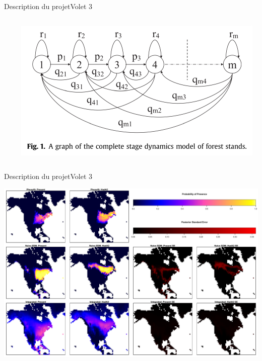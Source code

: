\documentclass{eecslides}
\begin{document}
\begin{frame}{Description du projet}{Volet 3}
\begin{columns}
\begin{column}{0.5\textwidth}
\begin{center}
				\end{center}	
			\end{column}
			\begin{column}{0.5\textwidth}
				\begin{center}
				\includegraphics[height=0.3\textheight]{markov}\\
				\end{center}
			\end{column}
		\end{columns}	    	
	\end{frame}


	\begin{frame}{Description du projet}{Volet 3}
		\begin{center}
		\includegraphics[height=0.6\textheight]{sdm_integration}\\
		\end{center}
	\end{frame}

	
\end{document}
